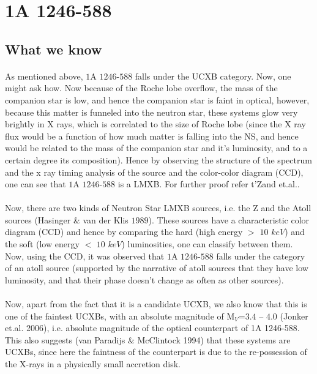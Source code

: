 \documentclass[a4paper,twoside]{report}
\numberwithin{equation}{section}
\begin{document}
\section{1A 1246-588}
\subsection{What we know}
\paragraph{}
As mentioned above, $1$A $1246$-$588$ falls under the UCXB category. Now, one might ask how. Now because of the Roche lobe overflow, the mass of the companion star is low, and hence the companion star is faint in optical, however, because this matter is funneled into the neutron star, these systems glow very brightly in X rays, which is correlated to the size of Roche lobe (since the X ray flux would be a function of how much matter is falling into the NS, and hence would be related to the mass of the companion star and it's luminosity, and to a certain degree its composition). Hence by observing the structure of the spectrum and the x ray timing analysis of the source and the color-color diagram (CCD), one can see that $1$A $1246$-$588$ is a LMXB. For further proof refer t'Zand et.al.\cite{t'Zand}.
\paragraph{}
Now, there are two kinds of Neutron Star LMXB sources, i.e. the Z and the Atoll sources (Hasinger \& van der Klis $1989$). These sources have a characteristic color diagram (CCD) and hence by comparing the hard (high energy $>$ $10$ $keV$) and the soft (low energy $<$ $10$ $keV$) luminosities, one can classify between them. Now, using the CCD, it was observed that $1$A $1246$-$588$ falls under the category of an atoll source (supported by the narrative of atoll sources that they have low luminosity, and that their phase doesn't change as often as other sources).
\paragraph{}
Now, apart from the fact that it is a candidate UCXB, we also know that this is one of the faintest UCXBs, with an absolute magnitude of M$_V$=$3.4$ -- $4.0$ (Jonker et.al. 2006), i.e. absolute magnitude of the optical counterpart of 1A 1246-588. This also suggests (van Paradijs \& McClintock 1994) that these systems are UCXBs, since here the faintness of the counterpart is due to the re-possession of the X-rays in a physically small accretion disk. 
\end{document}
